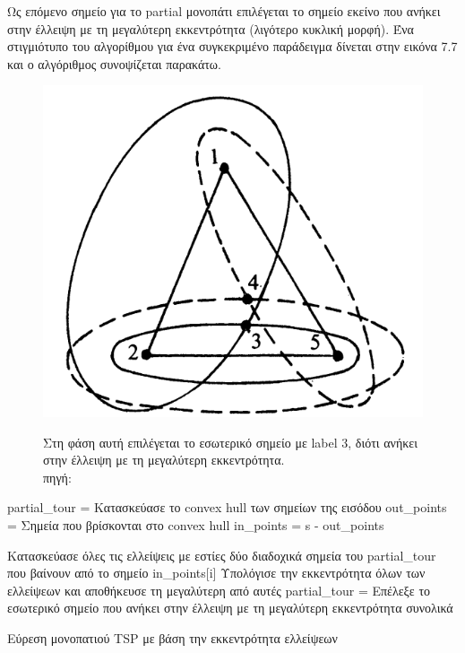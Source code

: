 \documentclass[oneside,12pt]{book}
\newenvironment{matlab}
	{\begin{figure}[hp]\centering\captionsetup{justification=centering}}
	{\end{figure}}
\theoremstyle{definition}
\begin{document}
 Ως επόμενο σημείο για το partial μονοπάτι επιλέγεται το σημείο εκείνο που ανήκει στην έλλειψη με τη μεγαλύτερη εκκεντρότητα (λιγότερο κυκλική μορφή). Ένα στιγμιότυπο του αλγορίθμου για ένα συγκεκριμένο παράδειγμα δίνεται στην εικόνα 7.7 και ο αλγόριθμος συνοψίζεται παρακάτω. \\

\begin{matlab}
  	\includegraphics[scale=0.3]{images/geometric_approach_ellipse2.png}
	\caption{Στη φάση αυτή επιλέγεται το εσωτερικό σημείο με label 3, διότι ανήκει στην έλλειψη με τη μεγαλύτερη εκκεντρότητα.\\ πηγή: \cite{16}}
\end{matlab}

\begin{algorithm}[H]
	\SetAlgoLined

	partial\_tour = Κατασκεύασε το convex hull των σημείων της εισόδου \;
	out\_points = Σημεία που βρίσκονται στο convex hull \;
	in\_points = s - out\_points \;

	{
		{
			Κατασκεύασε όλες τις ελλείψεις με εστίες δύο διαδοχικά σημεία του partial\_tour που βαίνουν από το σημείο in\_points[i] \;
			Υπολόγισε την εκκεντρότητα όλων των ελλείψεων και αποθήκευσε τη μεγαλύτερη από αυτές \;
		}
		partial\_tour = Επέλεξε το εσωτερικό σημείο που ανήκει στην έλλειψη με τη μεγαλύτερη εκκεντρότητα συνολικά \;
	}

	\caption{Εύρεση μονοπατιού TSP με βάση την εκκεντρότητα ελλείψεων}
\end{algorithm}
\end{document}
